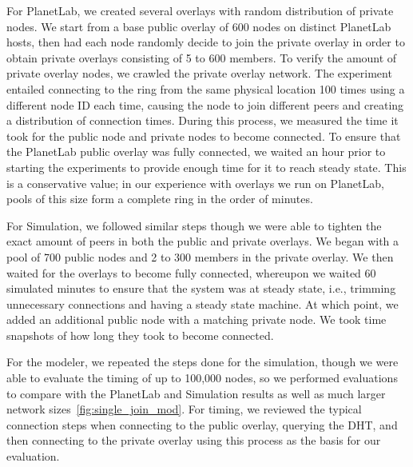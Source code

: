 \documentclass[conference]{IEEEtran}
\begin{document}
For PlanetLab, we created several overlays with random distribution of private
nodes.  We start from a base public overlay of
600 nodes on distinct PlanetLab hosts, then had each node randomly decide to join the private
overlay in order to obtain private overlays consisting of 5 to 600 members.  To
verify the amount of private overlay nodes, we crawled the private overlay network.
The experiment entailed connecting to the ring from the same physical location 100 times
using a different node ID each time, causing the node to join different peers and
creating a distribution of connection times. During this process, we measured the time it
took for the public node and private nodes to become connected.  To ensure that
the PlanetLab public overlay was fully connected, we waited an hour prior to starting the
experiments to provide enough time for it to reach steady state. This is a conservative
value; in our experience with overlays we run on PlanetLab, pools of this size form a complete
ring in the order of minutes.

For Simulation, we followed similar steps though we were able to tighten the
exact amount of peers in both the public and private overlays.  We began with
a pool of 700 public nodes and 2 to 300 members in the private overlay.  We
then waited for the overlays to become fully connected, whereupon we waited
60 simulated minutes to ensure that the system was at steady state, i.e.,
trimming unnecessary connections and having a steady state machine.  At which
point, we added an additional public node with a matching private node.  We
took time snapshots of how long they took to become connected.

For the modeler, we repeated the steps done for the simulation, though
we were able to evaluate the timing of up to 100,000 nodes, so we performed
evaluations to compare with the PlanetLab and Simulation results as well as
much larger network sizes~\ref{fig:single_join_mod}.  For timing, we reviewed
the typical connection steps when connecting to the public overlay, querying
the DHT, and then connecting to the private overlay using this process as the
basis for our evaluation.
\end{document}
